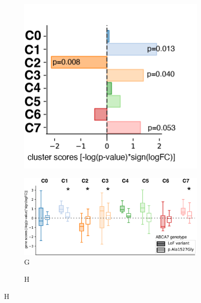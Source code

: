 \begin{figure}[H]
\begin{subfigure}[t]{0.225\textwidth}
        \includegraphics[width=\textwidth]{./main_plots/variant_path_scores.png}        
    \end{subfigure}
    \begin{subfigure}[t]{0.45\textwidth}
        \caption{G}
        \includegraphics[width=\textwidth]{./main_plots/common_var_distributions.png}        
    \end{subfigure}
    \begin{subfigure}[t]{0.3\textwidth}
        \caption{H}

\end{subfigure}
\end{figure}
